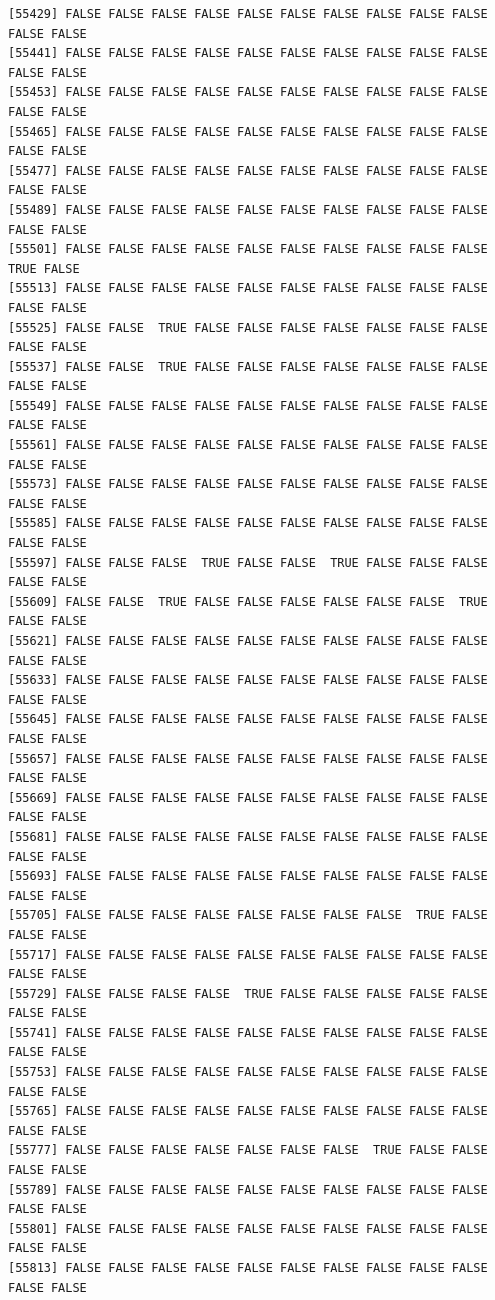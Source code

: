 \documentclass[
  a4paper,
  DIV=11,
  numbers=noendperiod]{scrartcl}
\begin{document}
\begin{verbatim}
[55429] FALSE FALSE FALSE FALSE FALSE FALSE FALSE FALSE FALSE FALSE FALSE FALSE
[55441] FALSE FALSE FALSE FALSE FALSE FALSE FALSE FALSE FALSE FALSE FALSE FALSE
[55453] FALSE FALSE FALSE FALSE FALSE FALSE FALSE FALSE FALSE FALSE FALSE FALSE
[55465] FALSE FALSE FALSE FALSE FALSE FALSE FALSE FALSE FALSE FALSE FALSE FALSE
[55477] FALSE FALSE FALSE FALSE FALSE FALSE FALSE FALSE FALSE FALSE FALSE FALSE
[55489] FALSE FALSE FALSE FALSE FALSE FALSE FALSE FALSE FALSE FALSE FALSE FALSE
[55501] FALSE FALSE FALSE FALSE FALSE FALSE FALSE FALSE FALSE FALSE  TRUE FALSE
[55513] FALSE FALSE FALSE FALSE FALSE FALSE FALSE FALSE FALSE FALSE FALSE FALSE
[55525] FALSE FALSE  TRUE FALSE FALSE FALSE FALSE FALSE FALSE FALSE FALSE FALSE
[55537] FALSE FALSE  TRUE FALSE FALSE FALSE FALSE FALSE FALSE FALSE FALSE FALSE
[55549] FALSE FALSE FALSE FALSE FALSE FALSE FALSE FALSE FALSE FALSE FALSE FALSE
[55561] FALSE FALSE FALSE FALSE FALSE FALSE FALSE FALSE FALSE FALSE FALSE FALSE
[55573] FALSE FALSE FALSE FALSE FALSE FALSE FALSE FALSE FALSE FALSE FALSE FALSE
[55585] FALSE FALSE FALSE FALSE FALSE FALSE FALSE FALSE FALSE FALSE FALSE FALSE
[55597] FALSE FALSE FALSE  TRUE FALSE FALSE  TRUE FALSE FALSE FALSE FALSE FALSE
[55609] FALSE FALSE  TRUE FALSE FALSE FALSE FALSE FALSE FALSE  TRUE FALSE FALSE
[55621] FALSE FALSE FALSE FALSE FALSE FALSE FALSE FALSE FALSE FALSE FALSE FALSE
[55633] FALSE FALSE FALSE FALSE FALSE FALSE FALSE FALSE FALSE FALSE FALSE FALSE
[55645] FALSE FALSE FALSE FALSE FALSE FALSE FALSE FALSE FALSE FALSE FALSE FALSE
[55657] FALSE FALSE FALSE FALSE FALSE FALSE FALSE FALSE FALSE FALSE FALSE FALSE
[55669] FALSE FALSE FALSE FALSE FALSE FALSE FALSE FALSE FALSE FALSE FALSE FALSE
[55681] FALSE FALSE FALSE FALSE FALSE FALSE FALSE FALSE FALSE FALSE FALSE FALSE
[55693] FALSE FALSE FALSE FALSE FALSE FALSE FALSE FALSE FALSE FALSE FALSE FALSE
[55705] FALSE FALSE FALSE FALSE FALSE FALSE FALSE FALSE  TRUE FALSE FALSE FALSE
[55717] FALSE FALSE FALSE FALSE FALSE FALSE FALSE FALSE FALSE FALSE FALSE FALSE
[55729] FALSE FALSE FALSE FALSE  TRUE FALSE FALSE FALSE FALSE FALSE FALSE FALSE
[55741] FALSE FALSE FALSE FALSE FALSE FALSE FALSE FALSE FALSE FALSE FALSE FALSE
[55753] FALSE FALSE FALSE FALSE FALSE FALSE FALSE FALSE FALSE FALSE FALSE FALSE
[55765] FALSE FALSE FALSE FALSE FALSE FALSE FALSE FALSE FALSE FALSE FALSE FALSE
[55777] FALSE FALSE FALSE FALSE FALSE FALSE FALSE  TRUE FALSE FALSE FALSE FALSE
[55789] FALSE FALSE FALSE FALSE FALSE FALSE FALSE FALSE FALSE FALSE FALSE FALSE
[55801] FALSE FALSE FALSE FALSE FALSE FALSE FALSE FALSE FALSE FALSE FALSE FALSE
[55813] FALSE FALSE FALSE FALSE FALSE FALSE FALSE FALSE FALSE FALSE FALSE FALSE

\end{verbatim}
\end{document}
